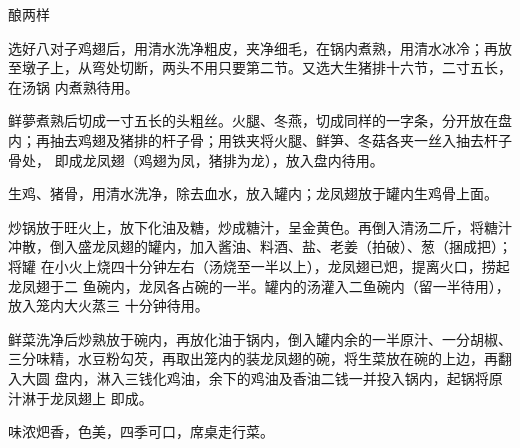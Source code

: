 \begin{recipe}[酿龙凤翅]{酿两样}

\ingredients


\preparation

\step 选好八对子鸡翅后，用清水洗净粗皮，夹净细毛，在锅内煮熟，用清水冰冷；再放
至墩子上，从弯处切断，两头不用只要第二节。又选大生猪排十六节，二寸五长，在汤锅
内煮熟待用。

\step 鲜夢煮熟后切成一寸五长的头粗丝。火腿、冬燕，切成同样的一字条，分开放在盘
内；再抽去鸡翅及猪排的杆子骨；用铁夹将火腿、鲜笋、冬菇各夹一丝入抽去杆子骨处，
即成龙凤翅（鸡翅为凤，猪排为龙），放入盘内待用。

\step 生鸡、猪骨，用清水洗净，除去血水，放入罐内；龙凤翅放于罐内生鸡骨上面。

\step 炒锅放于旺火上，放下化油及糖，炒成糖汁，呈金黄色。再倒入清汤二斤，将糖汁
冲散，倒入盛龙凤翅的罐内，加入酱油、料酒、盐、老姜（拍破）、葱（捆成把）；将罐
在小火上烧四十分钟左右（汤烧至一半以上），龙凤翅已𤆵，提离火口，捞起龙凤翅于二
鱼碗内，龙凤各占碗的一半。罐内的汤灌入二鱼碗内（留一半待用），放入笼内大火蒸三
十分钟待用。

\step 鲜菜洗净后炒熟放于碗内，再放化油于锅内，倒入罐内余的一半原汁、一分胡椒、
三分味精，水豆粉勾芡，再取出笼内的装龙凤翅的碗，将生菜放在碗的上边，再翻入大圆
盘内，淋入三钱化鸡油，余下的鸡油及香油二钱一并投入锅内，起锅将原汁淋于龙凤翅上
即成。

\features

味浓𤆵香，色美，四季可口，席桌走行菜。

\end{recipe}

